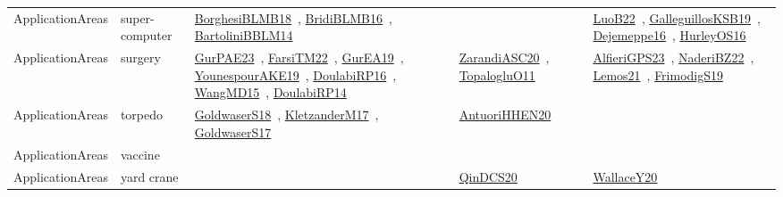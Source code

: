 {\begin{longtable}{lp{3cm}>{\raggedright\arraybackslash}p{6cm}>{\raggedright\arraybackslash}p{6cm}>{\raggedright\arraybackslash}p{8cm}}
ApplicationAreas & super-computer & \href{works/BorghesiBLMB18.pdf}{BorghesiBLMB18}~\cite{BorghesiBLMB18}, \href{works/BridiBLMB16.pdf}{BridiBLMB16}~\cite{BridiBLMB16}, \href{works/BartoliniBBLM14.pdf}{BartoliniBBLM14}~\cite{BartoliniBBLM14} &  & \href{works/LuoB22.pdf}{LuoB22}~\cite{LuoB22}, \href{works/GalleguillosKSB19.pdf}{GalleguillosKSB19}~\cite{GalleguillosKSB19}, \href{works/Dejemeppe16.pdf}{Dejemeppe16}~\cite{Dejemeppe16}, \href{works/HurleyOS16.pdf}{HurleyOS16}~\cite{HurleyOS16}\\
ApplicationAreas & surgery & \href{works/GurPAE23.pdf}{GurPAE23}~\cite{GurPAE23}, \href{works/FarsiTM22.pdf}{FarsiTM22}~\cite{FarsiTM22}, \href{works/GurEA19.pdf}{GurEA19}~\cite{GurEA19}, \href{works/YounespourAKE19.pdf}{YounespourAKE19}~\cite{YounespourAKE19}, \href{works/DoulabiRP16.pdf}{DoulabiRP16}~\cite{DoulabiRP16}, \href{works/WangMD15.pdf}{WangMD15}~\cite{WangMD15}, \href{works/DoulabiRP14.pdf}{DoulabiRP14}~\cite{DoulabiRP14} & \href{works/ZarandiASC20.pdf}{ZarandiASC20}~\cite{ZarandiASC20}, \href{works/TopalogluO11.pdf}{TopalogluO11}~\cite{TopalogluO11} & \href{works/AlfieriGPS23.pdf}{AlfieriGPS23}~\cite{AlfieriGPS23}, \href{works/NaderiBZ22.pdf}{NaderiBZ22}~\cite{NaderiBZ22}, \href{works/Lemos21.pdf}{Lemos21}~\cite{Lemos21}, \href{works/FrimodigS19.pdf}{FrimodigS19}~\cite{FrimodigS19}\\
ApplicationAreas & torpedo & \href{works/GoldwaserS18.pdf}{GoldwaserS18}~\cite{GoldwaserS18}, \href{works/KletzanderM17.pdf}{KletzanderM17}~\cite{KletzanderM17}, \href{works/GoldwaserS17.pdf}{GoldwaserS17}~\cite{GoldwaserS17} & \href{works/AntuoriHHEN20.pdf}{AntuoriHHEN20}~\cite{AntuoriHHEN20} & \\
ApplicationAreas & vaccine &  &  & \\
ApplicationAreas & yard crane &  & \href{works/QinDCS20.pdf}{QinDCS20}~\cite{QinDCS20} & \href{works/WallaceY20.pdf}{WallaceY20}~\cite{WallaceY20}\\
\end{longtable}
}

